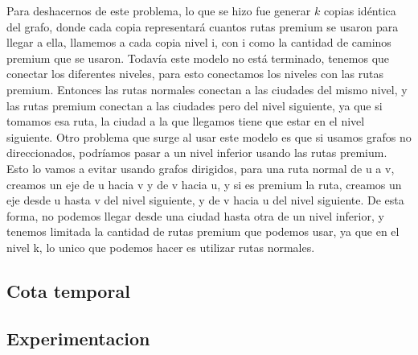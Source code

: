 Para deshacernos de este problema, lo que se hizo fue generar $k$ copias idéntica del grafo, donde cada copia representará cuantos rutas premium se usaron para llegar a ella, llamemos a cada copia nivel i, con i como la cantidad de caminos premium que se usaron. Todavía este modelo no está terminado, tenemos que conectar los diferentes niveles, para esto conectamos los niveles con las rutas premium. Entonces las rutas normales conectan a las ciudades del mismo nivel, y las rutas premium conectan a las ciudades pero del nivel siguiente, ya que si tomamos esa ruta, la ciudad a la que llegamos tiene que estar en el nivel siguiente.
Otro problema que surge al usar este modelo es que si usamos grafos no direccionados, podríamos pasar a un nivel inferior usando las rutas premium. Esto lo vamos a evitar usando grafos dirigidos, para una ruta normal de u a v, creamos un eje de u hacia v y de v hacia u, y si es premium la ruta, creamos un eje desde u hasta v del nivel siguiente, y de v hacia u del nivel siguiente. De esta forma, no podemos llegar desde una ciudad hasta otra de un nivel inferior, y tenemos limitada la cantidad de rutas premium que podemos usar, ya que en el nivel k, lo unico que podemos hacer es utilizar rutas normales.

\subsection{Cota temporal}

\subsection{Experimentacion}

\pagebreak
